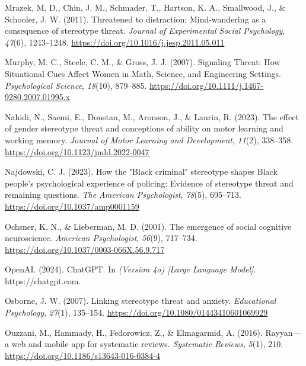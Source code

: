 \documentclass[
  stu, a4paper,floatsintext]{apa7}
\newlength{\cslhangindent}
\newenvironment{CSLReferences}[2] %
 {\begin{list}{}{%
  \setlength{\itemindent}{0pt}
  \setlength{\leftmargin}{0pt}
  \setlength{\parsep}{0pt}
  \ifodd #1
   \setlength{\leftmargin}{\cslhangindent}
   \setlength{\itemindent}{-1\cslhangindent}
  \fi
  \setlength{\itemsep}{#2\baselineskip}}}
 {\end{list}}
\begin{document}
\begin{CSLReferences}{1}{0}
Mrazek, M. D., Chin, J. M., Schmader, T., Hartson, K. A., Smallwood, J., \& Schooler, J. W. (2011). Threatened to distraction: {Mind-wandering} as a consequence of stereotype threat. \emph{Journal of Experimental Social Psychology}, \emph{47}(6), 1243--1248. \url{https://doi.org/10.1016/j.jesp.2011.05.011}

Murphy, M. C., Steele, C. M., \& Gross, J. J. (2007). Signaling {Threat}: {How Situational Cues Affect Women} in {Math}, {Science}, and {Engineering Settings}. \emph{Psychological Science}, \emph{18}(10), 879--885. \url{https://doi.org/10.1111/j.1467-9280.2007.01995.x}

Nahidi, N., Saemi, E., Doustan, M., Aronson, J., \& Laurin, R. (2023). The effect of gender stereotype threat and conceptions of ability on motor learning and working memory. \emph{Journal of Motor Learning and Development}, \emph{11}(2), 338--358. \url{https://doi.org/10.1123/jmld.2022-0047}

Najdowski, C. J. (2023). How the "{Black} criminal" stereotype shapes {Black} people's psychological experience of policing: {Evidence} of stereotype threat and remaining questions. \emph{The American Psychologist}, \emph{78}(5), 695--713. \url{https://doi.org/10.1037/amp0001159}

Ochsner, K. N., \& Lieberman, M. D. (2001). The emergence of social cognitive neuroscience. \emph{American Psychologist}, \emph{56}(9), 717--734. \url{https://doi.org/10.1037/0003-066X.56.9.717}

OpenAI. (2024). {ChatGPT}. In \emph{(Version 4o) {[}Large Language Model{]}}. https://chatgpt.com.

Osborne, J. W. (2007). Linking stereotype threat and anxiety. \emph{Educational Psychology}, \emph{27}(1), 135--154. \url{https://doi.org/10.1080/01443410601069929}

Ouzzani, M., Hammady, H., Fedorowicz, Z., \& Elmagarmid, A. (2016). Rayyan---a web and mobile app for systematic reviews. \emph{Systematic Reviews}, \emph{5}(1), 210. \url{https://doi.org/10.1186/s13643-016-0384-4}


\end{CSLReferences}
\end{document}
